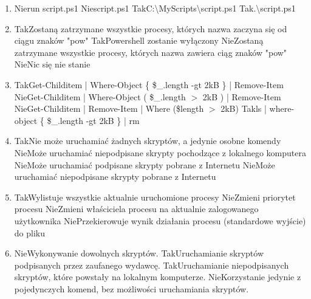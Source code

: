\begin{enumerate}
		\newpage
		\item {}%
		{Nie}{run script.ps1}%
		{Nie}{script.ps1}%
		{Tak}{C:\textbackslash MyScripts\textbackslash script.ps1}%
		{Tak}{.\textbackslash script.ps1}
		\item {}%
		{Tak}{Zostaną zatrzymane wszystkie procesy, których nazwa zaczyna się od ciągu znaków "pow"}%
		{Tak}{Powershell zostanie wyłączony}%
		{Nie}{Zostaną zatrzymane wszystkie procesy, których nazwa zawiera ciąg znaków "pow"}%
		{Nie}{Nic się nie stanie}
		\item {}%
		{Tak}{Get-Childitem | Where-Object \{ \$\_.length -gt 2kB \} | Remove-Item}%
		{Nie}{Get-Childitem | Where-Object ( \$\_.length $ > $ 2kB ) | Remove-Item}%
		{Nie}{Get-Childitem | Remove-Item | Where (\$length $ > $ 2kB)}%
		{Tak}{ls | where-object \{ \$\_.length -gt 2kB \} | rm}
		\item {}%
		{Tak}{Nie może uruchamiać żadnych skryptów, a jedynie osobne komendy}%
		{Nie}{Może uruchamiać niepodpisane skrypty pochodzące z lokalnego komputera}%
		{Nie}{Może uruchamiać podpisane skrypty pobrane z Internetu}%
		{Nie}{Może uruchamiać niepodpisane skrypty pobrane z Internetu}
		\item {}%
		{Tak}{Wylistuje wszystkie aktualnie uruchomione procesy}%
		{Nie}{Zmieni priorytet procesu}%
		{Nie}{Zmieni właściciela procesu na aktualnie zalogowanego użytkownika}%
		{Nie}{Przekierowuje wynik działania procesu (standardowe wyjście) do pliku}
		\item {}%
		{Nie}{Wykonywanie dowolnych skryptów.}%
		{Tak}{Uruchamianie skryptów podpisanych przez zaufanego wydawcę.}%
		{Tak}{Uruchamianie niepodpisanych skryptów, które powstały na lokalnym komputerze.}%
		{Nie}{Korzystanie jedynie z pojedynczych komend, bez możliwości uruchamiania skryptów.}
		

\end{enumerate}
